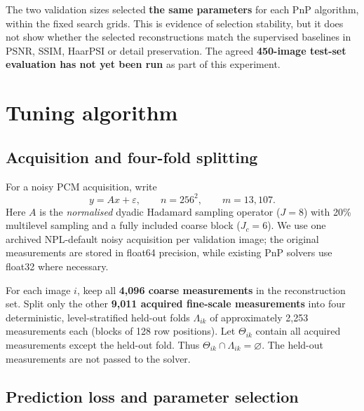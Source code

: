 \documentclass[a4paper,10pt]{article}
\begin{document}
The two validation sizes selected \textbf{the same parameters} for each PnP algorithm, within the fixed search grids. This is evidence of selection stability, but it does not show whether the selected reconstructions match the supervised baselines in PSNR, SSIM, HaarPSI or detail preservation. The agreed \textbf{450-image test-set evaluation has not yet been run} as part of this experiment.

\section{Tuning algorithm}

\subsection*{Acquisition and four-fold splitting}

For a noisy PCM acquisition, write
\begin{equation}
 y=Ax+\varepsilon,\qquad n=256^2,\qquad m=13{,}107.
\end{equation}
Here $A$ is the \emph{normalised} dyadic Hadamard sampling operator ($J=8$) with 20\% multilevel sampling and a fully included coarse block ($J_c=6$). We use one archived NPL-default noisy acquisition per validation image; the original measurements are stored in float64 precision, while existing PnP solvers use float32 where necessary.

For each image $i$, keep all \textbf{4,096 coarse measurements} in the reconstruction set. Split only the other \textbf{9,011 acquired fine-scale measurements} into four deterministic, level-stratified held-out folds $\Lambda_{ik}$ of approximately 2,253 measurements each (blocks of 128 row positions). Let $\Theta_{ik}$ contain all acquired measurements except the held-out fold. Thus $\Theta_{ik}\cap\Lambda_{ik}=\varnothing$. The held-out measurements are not passed to the solver.

\subsection*{Prediction loss and parameter selection}
\end{document}

